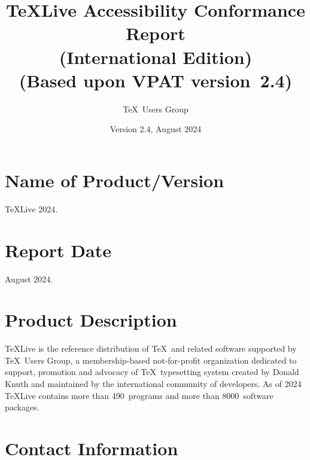 \documentclass[titlepage]{article}
\begin{document}
\title{\TeX Live Accessibility Conformance Report\\
  (International Edition)\\
(Based upon VPAT\textsuperscript{\textregistered} version~2.4)}
\author{\TeX\ Users Group}
\date{Version 2.4, August 2024}

\hypersetup{
  pdftitle=TeX Live Accessibility Conformance Report,
  pdfauthor=TeX Users Group}
  
\maketitle

\newpage
{} 
\tableofcontents 

\newpage

\section{Name of Product/Version}
\label{sec:name}

\TeX Live 2024.


\section{Report Date}
\label{sec:date}

August 2024.


\section{Product Description}
\label{sec:description}

\TeX Live is the reference distribution of \TeX\ and related software
supported by \TeX\ Users Group, a membership-based not-for-profit
organization dedicated to support, promotion and advocacy of \TeX\
typesetting system created by Donald Knuth and maintained by the
international community of developers.  As of 2024 \TeX Live contains
more than 490~programs and more than 8000~software packages.

\section{Contact Information}
\label{sec:contact_info}
\end{document}
